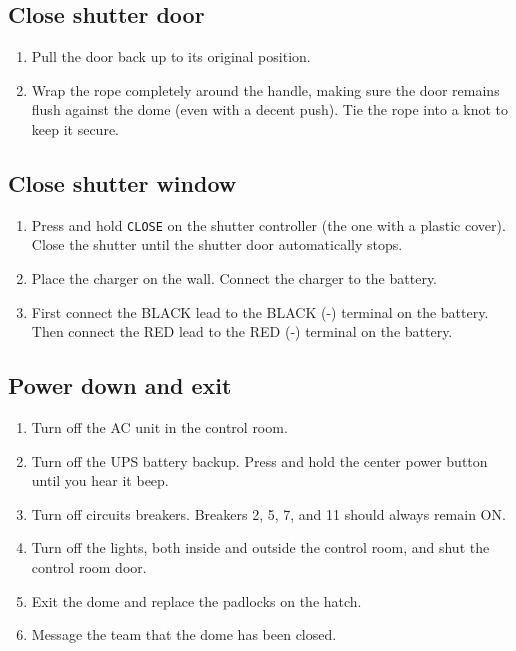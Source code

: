 \documentclass{article}
\begin{document}
	\subsection{Close shutter door}
	\label{sec:close-shutter-door}
	
	\begin{enumerate}
		
		\item Pull the door back up to its original position.
		
		\item Wrap the rope completely around the handle, making sure the door remains flush against the dome (even with a decent push). Tie the rope into a knot to keep it secure.
		
	\end{enumerate}
	
	\subsection{Close shutter window}
	\label{sec:close-shutter-window}
	
	\begin{enumerate}
		
		\item Press and hold \texttt{CLOSE} on the shutter controller (the one with a plastic cover). Close the shutter until the shutter door automatically stops.

		\item Place the charger on the wall. Connect the charger to the battery.
		
		\item First connect the BLACK lead to the BLACK (-) terminal on the battery. Then connect the RED lead to the RED (-) terminal on the battery.
		
	\end{enumerate}
	
	\subsection{Power down and exit}
	\label{sec:power-down-and-exit}
	
	\begin{enumerate}
		
		\item Turn off the AC unit in the control room.
		
		\item Turn off the UPS battery backup. Press and hold the center power button until you hear it beep.
		
		\item Turn off circuits breakers. Breakers 2, 5, 7, and 11 should always remain ON.
		
		\item Turn off the lights, both inside and outside the control room, and shut the control room door.
		
		\item Exit the dome and replace the padlocks on the hatch.
		
		\item Message the team that the dome has been closed.
		
	\end{enumerate}
\end{document}
